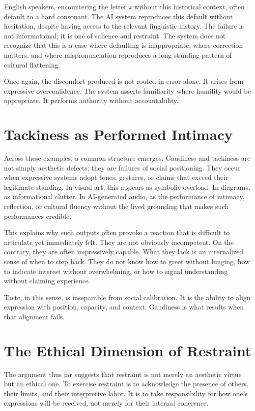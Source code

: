 \documentclass[12pt]{article}
\begin{document}
English speakers, encountering the letter \emph{x} without this historical context, often default to a hard consonant. The AI system reproduces this default without hesitation, despite having access to the relevant linguistic history. The failure is not informational; it is one of salience and restraint. The system does not recognize that this is a case where defaulting is inappropriate, where correction matters, and where mispronunciation reproduces a long-standing pattern of cultural flattening.

Once again, the discomfort produced is not rooted in error alone. It arises from expressive overconfidence. The system asserts familiarity where humility would be appropriate. It performs authority without accountability.

\section{Tackiness as Performed Intimacy}

Across these examples, a common structure emerges. Gaudiness and tackiness are not simply aesthetic defects; they are failures of social positioning. They occur when expressive systems adopt tones, gestures, or claims that exceed their legitimate standing. In visual art, this appears as symbolic overload. In diagrams, as informational clutter. In AI-generated audio, as the performance of intimacy, reflection, or cultural fluency without the lived grounding that makes such performances credible.

This explains why such outputs often provoke a reaction that is difficult to articulate yet immediately felt. They are not obviously incompetent. On the contrary, they are often impressively capable. What they lack is an internalized sense of when to step back. They do not know how to greet without lunging, how to indicate interest without overwhelming, or how to signal understanding without claiming experience.

Taste, in this sense, is inseparable from social calibration. It is the ability to align expression with position, capacity, and context. Gaudiness is what results when that alignment fails.

\section{The Ethical Dimension of Restraint}

The argument thus far suggests that restraint is not merely an aesthetic virtue but an ethical one. To exercise restraint is to acknowledge the presence of others, their limits, and their interpretive labor. It is to take responsibility for how one’s expressions will be received, not merely for their internal coherence.
\end{document}
